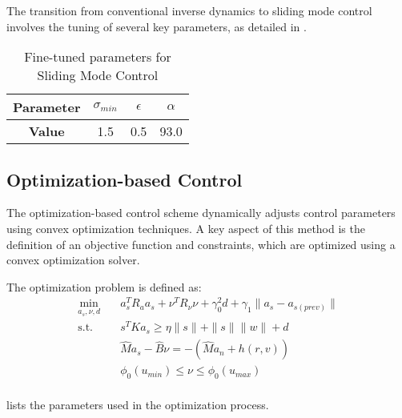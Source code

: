     The transition from conventional inverse dynamics to sliding mode control involves the tuning of several key parameters, as detailed in .
    
    \begin{table}[H]
        \captionsetup{justification=centering}
        \caption{Fine-tuned parameters for Sliding Mode Control}
        \begin{center}
        \begin{tabular}{|c|c|c|c|}
        \hline
        \textbf{Parameter} & $\sigma_{min}$ & $\epsilon$ & 
        $\alpha$ \\ \hline
        \textbf{Value} & 1.5 & 0.5 & 93.0\\ \hline
        \end{tabular}
        \end{center}
        \label{table:smc_coefs}
    \end{table}
    
    \subsection{Optimization-based Control}
    
    The optimization-based control scheme dynamically adjusts control parameters using convex optimization techniques. A key aspect of this method is the definition of an objective function and constraints, which are optimized using a convex optimization solver. 
    
    The optimization problem is defined as:
    \begin{equation*}
        \begin{aligned}
        \min_{a_s, \nu, d} \quad & a_s^T R_a a_s + \nu^T R_\nu \nu +
        \gamma_0^2 d + \gamma_1 \|a_s - a_{s (prev)}\|\\
        \textrm{s.t.} \quad & s^TKa_s \geq \eta \|s\| + \|s\|\|w\| + d\\
        &\hat Ma_s - \hat B\nu = -(\hat{M}a_n + h(r, v)) \\
        &\phi_0(u_{min}) \leq \nu \leq \phi_0(u_{max}) \\
        \end{aligned}
    \end{equation*}
    
     lists the parameters used in the optimization process.
    
